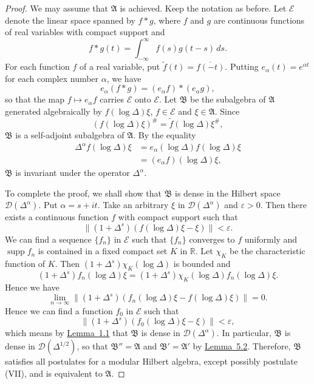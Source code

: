 \documentclass[12pt,b5paper,twoside]{article}
\theoremstyle{takesaki}
\numberwithin{equation}{section}
\begin{document}
\begin{proof}
We may assume that $\mathfrak A$ is achieved.  Keep the notation as
before.  Let $\mathcal E$ denote the linear space spanned by $f*g$,
where $f$ and $g$ are continuous functions of real variables with
compact support and
\[
  f*g(t)=\int_{-\infty}^{\infty}f(s)g(t-s)\,ds.
\]
For each function $f$ of a real variable, put
$\widetilde f(t)=\overline{f(-t)}$.  Putting
$e_\alpha(t)=e^{\alpha t}$ for each complex number $\alpha$, we have
\[
  e_\alpha(f*g)=(e_\alpha f)*(e_\alpha g),
\]
so that the map $f\mapsto e_\alpha f$ carries $\mathcal E$ onto
$\mathcal E$.  Let $\mathfrak B$ be the subalgebra of $\mathfrak A$
generated algebraically by $f(\log\Delta)\xi$,
$f\in\mathcal E$ and $\xi\in\mathfrak A$.  Since
\[
  (f(\log\Delta)\xi)^{\#}
  =\widetilde f(\log\Delta)\xi^{\#},
\]
$\mathfrak B$ is a self-adjoint subalgebra of $\mathfrak A$.  By the
equality
\begin{align*}
 \Delta^\alpha f(\log\Delta)\xi
 &=e_\alpha(\log\Delta)f(\log\Delta)\xi\\
 &=(e_\alpha f)(\log\Delta)\xi,
\end{align*}
$\mathfrak B$ is invariant under the operator $\Delta^\alpha$.

To complete the proof, we shall show that $\mathfrak B$ is dense in
the Hilbert space $\mathcal D(\Delta^\alpha)$.  Put
$\alpha=s+it$.  Take an arbitrary $\xi$ in
$\mathcal D(\Delta^\alpha)$ and $\varepsilon>0$.  Then there exists a
continuous function $f$ with compact support such that
\[
  \|(1+\Delta^s)(f(\log\Delta)\xi-\xi)\|<\varepsilon.
\]
We can find a sequence $\{f_n\}$ in $\mathcal E$ such that
$\{f_n\}$ converges to $f$ uniformly and $\operatorname{supp}f_n$ is
contained in a fixed compact set $K$ in $\mathbb R$.  Let $\chi_K$ be
the characteristic function of $K$.  Then
$(1+\Delta^s)\chi_K(\log\Delta)$ is bounded and
\[
  (1+\Delta^s)f_n(\log\Delta)\xi
  =(1+\Delta^s)\chi_K(\log\Delta)f_n(\log\Delta)\xi.
\]
Hence we have
\[
  \lim_{n\to\infty}
  \|(1+\Delta^s)(f_n(\log\Delta)\xi-f(\log\Delta)\xi)\|=0.
\]
Hence we can find a function $f_0$ in $\mathcal E$ such that
\[
  \|(1+\Delta^s)(f_0(\log\Delta)\xi-\xi)\|<\varepsilon,
\]
which means by \hyperref[lem:1.1]{Lemma~1.1} that $\mathfrak B$ is
dense in $\mathcal D(\Delta^\alpha)$.  In particular, $\mathfrak B$
is dense in $\mathcal D(\Delta^{1/2})$, so that
$\mathfrak B''=\mathfrak A$ and $\mathfrak B'=\mathfrak A'$ by
\hyperref[lem:5.2]{Lemma~5.2}.  Therefore, $\mathfrak B$ satisfies all
postulates for a modular Hilbert algebra, except possibly postulate
(VII), and is equivalent to $\mathfrak A$.


\end{proof}
\end{document}
